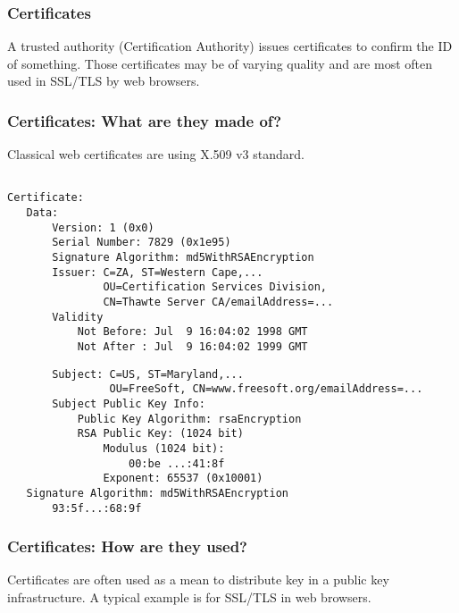 
\begin{frame}
\frametitle{Certificates}
A trusted authority (Certification Authority) issues certificates to
confirm the ID of something. Those certificates may be of varying
quality and are most often used in SSL/TLS by web browsers.
\end{frame}


\begin{frame}[fragile]
\frametitle{Certificates: What are they made of?}
Classical web certificates are using X.509 v3 standard.

\small
\begin{verbatim}

Certificate:
   Data:
       Version: 1 (0x0)
       Serial Number: 7829 (0x1e95)
       Signature Algorithm: md5WithRSAEncryption
       Issuer: C=ZA, ST=Western Cape,...
               OU=Certification Services Division,
               CN=Thawte Server CA/emailAddress=...
       Validity
           Not Before: Jul  9 16:04:02 1998 GMT
           Not After : Jul  9 16:04:02 1999 GMT
\end{verbatim}

\end{frame}



\begin{frame}[fragile]

\small
\begin{verbatim}
       Subject: C=US, ST=Maryland,...
                OU=FreeSoft, CN=www.freesoft.org/emailAddress=...
       Subject Public Key Info:
           Public Key Algorithm: rsaEncryption
           RSA Public Key: (1024 bit)
               Modulus (1024 bit):
                   00:be ...:41:8f
               Exponent: 65537 (0x10001)
   Signature Algorithm: md5WithRSAEncryption
       93:5f...:68:9f
\end{verbatim}

\end{frame}



\begin{frame}
\frametitle{Certificates: How are they used?}
Certificates are often used as a mean to distribute key in a public
key infrastructure. A typical example is for SSL/TLS in web browsers.
\end{frame}

